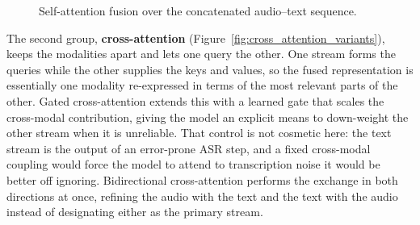\documentclass[a4paper,12pt]{article}
\begin{document}
\begin{figure}[ht]
\centering
{}
\caption{Self-attention fusion over the concatenated audio--text sequence.}
\label{fig:self_attention_fusion}
\end{figure}

The second group, \textbf{cross-attention} (Figure~\ref{fig:cross_attention_variants}), keeps the modalities apart and lets one query the other. One stream forms the queries while the other supplies the keys and values, so the fused representation is essentially one modality re-expressed in terms of the most relevant parts of the other. Gated cross-attention extends this with a learned gate that scales the cross-modal contribution, giving the model an explicit means to down-weight the other stream when it is unreliable. That control is not cosmetic here: the text stream is the output of an error-prone ASR step, and a fixed cross-modal coupling would force the model to attend to transcription noise it would be better off ignoring. Bidirectional cross-attention performs the exchange in both directions at once, refining the audio with the text and the text with the audio instead of designating either as the primary stream.
\end{document}
